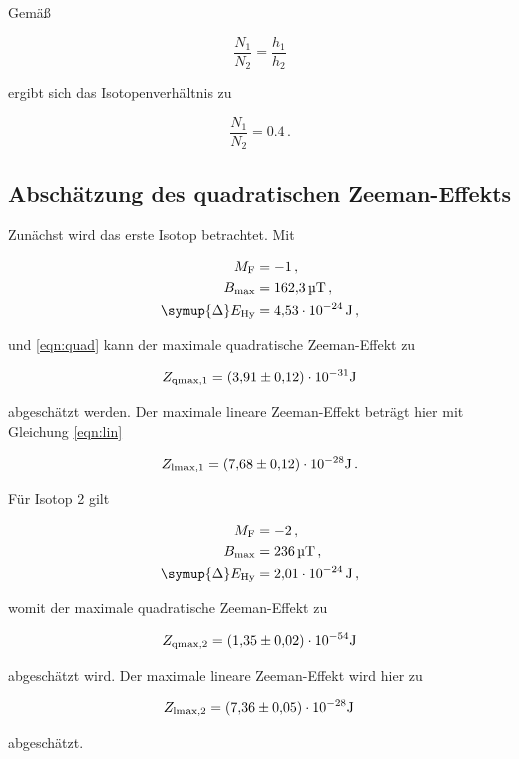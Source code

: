Gemäß

\begin{equation*}
  \frac{N_1}{N_2} = \frac{h_1}{h_2}
\end{equation*}

ergibt sich das Isotopenverhältnis zu 

\begin{equation*}
  \frac{N_1}{N_2} = \num{0.4}\,.
\end{equation*}

\subsection{Abschätzung des quadratischen Zeeman-Effekts}

Zunächst wird das erste Isotop betrachtet. Mit

\begin{align*}
  M_\text{F} &= -1\,,\\
  B_\text{max} &= \SI{162.3}{\micro\tesla}\,,\\
  \symup{\Delta}E_\text{Hy} &= \SI{4.53e-24}{\joule}\,,\\
\end{align*}

und \eqref{eqn:quad} kann der maximale quadratische Zeeman-Effekt zu 

\begin{equation*}
  Z_\text{qmax,1} = \num{3.91\pm 0.12e-31}\si{\joule}
\end{equation*}

abgeschätzt werden. Der maximale lineare Zeeman-Effekt beträgt hier mit Gleichung \eqref{eqn:lin}

\begin{equation*}
  Z_\text{lmax,1} = \num{7.68\pm 0.12e-28}\si{\joule}\,.
\end{equation*}

Für Isotop 2 gilt

\begin{align*}
  M_\text{F} &= -2\,,\\
  B_\text{max} &= \SI{236}{\micro\tesla}\,,\\
  \symup{\Delta}E_\text{Hy} &= \SI{2.01e-24}{\joule}\,,\\
\end{align*}

womit der maximale quadratische Zeeman-Effekt zu 

\begin{equation*}
  Z_\text{qmax,2} = \num{1.35\pm 0.02e-54}\si{\joule}
\end{equation*}

abgeschätzt wird. Der maximale lineare Zeeman-Effekt wird hier zu 

\begin{equation*}
  Z_\text{lmax,2} = \num{7.36\pm 0.05e-28}\si{\joule}\,
\end{equation*}

abgeschätzt.